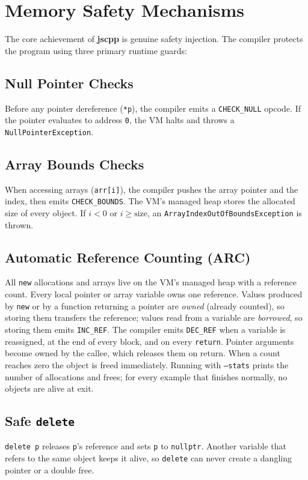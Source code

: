 \documentclass[12pt, a4paper]{article}
\begin{document}
\section{Memory Safety Mechanisms}
The core achievement of \textbf{jscpp} is genuine safety injection. The compiler protects the program using three primary runtime guards:

\subsection{Null Pointer Checks}
Before any pointer dereference (\texttt{*p}), the compiler emits a \texttt{CHECK\_NULL} opcode. If the pointer evaluates to address \texttt{0}, the VM halts and throws a \texttt{NullPointerException}.

\subsection{Array Bounds Checks}
When accessing arrays (\texttt{arr[i]}), the compiler pushes the array pointer and the index, then emits \texttt{CHECK\_BOUNDS}. The VM's managed heap stores the allocated size of every object. If $i < 0$ or $i \ge \text{size}$, an \texttt{ArrayIndexOutOfBoundsException} is thrown.

\subsection{Automatic Reference Counting (ARC)}
All \texttt{new} allocations and arrays live on the VM's managed heap with a reference count. Every local pointer or array variable owns one reference. Values produced by \texttt{new} or by a function returning a pointer are \emph{owned} (already counted), so storing them transfers the reference; values read from a variable are \emph{borrowed}, so storing them emits \texttt{INC\_REF}. The compiler emits \texttt{DEC\_REF} when a variable is reassigned, at the end of every block, and on every \texttt{return}. Pointer arguments become owned by the callee, which releases them on return. When a count reaches zero the object is freed immediately. Running with \texttt{--stats} prints the number of allocations and frees; for every example that finishes normally, no objects are alive at exit.

\subsection{Safe \texttt{delete}}
\texttt{delete p} releases \texttt{p}'s reference and sets \texttt{p} to \texttt{nullptr}. Another variable that refers to the same object keeps it alive, so \texttt{delete} can never create a dangling pointer or a double free.
\end{document}
